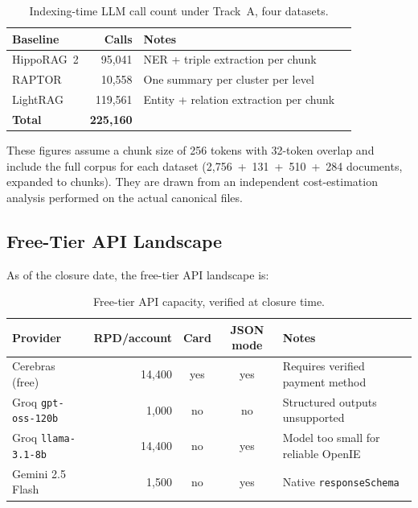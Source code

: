\documentclass[11pt,a4paper]{article}
\begin{document}
\begin{table}[h]
\centering
\small
\begin{tabularx}{\linewidth}{lrlX}
\toprule
\textbf{Baseline} & \textbf{Calls} & \textbf{Notes} \\
\midrule
HippoRAG~2 & 95{,}041  & NER + triple extraction per chunk \\
RAPTOR     & 10{,}558  & One summary per cluster per level \\
LightRAG   & 119{,}561 & Entity + relation extraction per chunk \\
\midrule
\textbf{Total} & \textbf{225{,}160} & \\
\bottomrule
\end{tabularx}
\caption{Indexing-time LLM call count under Track~A, four datasets.}
\label{tab:calls}
\end{table}

These figures assume a chunk size of 256 tokens with 32-token overlap and include the full corpus for each dataset (2{,}756~+~131~+~510~+~284 documents, expanded to chunks). They are drawn from an independent cost-estimation analysis performed on the actual canonical files.

\subsection{Free-Tier API Landscape}

As of the closure date, the free-tier API landscape is:

\begin{table}[h]
\centering
\small
\begin{tabularx}{\linewidth}{lrccX}
\toprule
\textbf{Provider} & \textbf{RPD/account} & \textbf{Card} & \textbf{JSON mode} & \textbf{Notes} \\
\midrule
Cerebras (free)        & 14{,}400 & yes & yes & Requires verified payment method \\
Groq \texttt{gpt-oss-120b} & 1{,}000 & no & no & Structured outputs unsupported \\
Groq \texttt{llama-3.1-8b} & 14{,}400 & no & yes & Model too small for reliable OpenIE \\
Gemini 2.5 Flash       & 1{,}500 & no & yes & Native \texttt{responseSchema} \\
\bottomrule
\end{tabularx}
\caption{Free-tier API capacity, verified at closure time.}
\label{tab:free}
\end{table}
\end{document}
